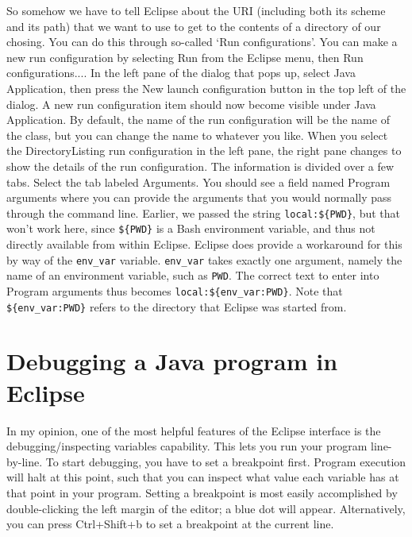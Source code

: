 \documentclass[12pt, a4paper, twoside, openany, titlepage]{book}
\begin{document}
So somehow we have to tell Eclipse about the URI (including both its scheme and its path) that we want to use to get to the contents of a directory of our chosing. You can do this through so-called `Run configurations'. You can make a new run configuration by selecting \textsf{Run} from the Eclipse menu, then \textsf{Run configurations...}. In the left pane of the dialog that pops up, select \textsf{Java Application}, then press the \textsf{New launch configuration} button in the top left of the dialog. A new run configuration item should now become visible under \textsf{Java Application}. By default, the name of the run configuration will be the name of the class, but you can change the name to whatever you like. When you select the \textsf{DirectoryListing} run configuration in the left pane, the right pane changes to show the details of the run configuration. The information is divided over a few tabs. Select the tab labeled \textsf{Arguments}. You should see a field named \textsf{Program arguments} where you can provide the arguments that you would normally pass through the command line. Earlier, we passed the string \texttt{local:\$\{PWD\}}, but that won't work here, since \texttt{\$\{PWD\}} is a Bash environment variable, and thus not directly available from within Eclipse. Eclipse does provide a workaround for this by way of the \texttt{env\_var} variable. \texttt{env\_var} takes exactly one argument, namely the name of an environment variable, such as \texttt{PWD}. The correct text to enter into \textsf{Program arguments} thus becomes \texttt{local:\$\{env\_var:PWD\}}. Note that \texttt{\$\{env\_var:PWD\}} refers to the directory that Eclipse was started from.





\section{Debugging a Java program in Eclipse}




In my opinion, one of the most helpful features of the Eclipse interface is the debugging/inspecting variables capability. This lets you run your program line-by-line. To start debugging, you have to set a breakpoint first. Program execution will halt at this point, such that you can inspect what value each variable has at that point in your program. Setting a breakpoint is most easily accomplished by double-clicking the left margin of the editor; a blue dot will appear. Alternatively, you can press \textsf{Ctrl+Shift+b} to set a breakpoint at the current line.
\end{document}
